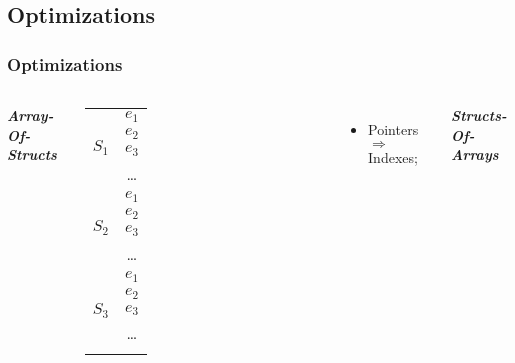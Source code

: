 \subsection{Optimizations}
\begin{frame}
	\frametitle{Optimizations}
	\begin{columns}
		\smaller
			\centering
			\textbf{\itshape Array-Of-Structs}

			\smaller
			\begin{tabular}{|c|c|}
				\hline
				\multirow{4}{*}{$S_{1}$} & $e_{1}$\\
				\cline{2-2}
				& $e_{2}$\\
				\cline{2-2}
				& $e_{3}$\\
				\cline{2-2}
				& \ldots\\
				\hline
				\multirow{4}{*}{$S_{2}$} & $e_{1}$\\
				\cline{2-2}
				& $e_{2}$\\
				\cline{2-2}
				& $e_{3}$\\
				\cline{2-2}
				& \ldots\\

				\hline
				\multirow{5}{*}{$S_{3}$} & $e_{1}$\\
				\cline{2-2}
				& $e_{2}$\\
				\cline{2-2}
				& $e_{3}$\\
				\cline{2-2}
				& \dots\\
				\hline
				\multicolumn{2}{|c|}{\ldots}
			\end{tabular}
			\larger

			\begin{itemize}
				\item Pointers $\Rightarrow$ Indexes;
			\end{itemize}

			\pause
			\centering
			\textbf{\itshape Structs-Of-Arrays}


\end{columns}
\end{frame}
